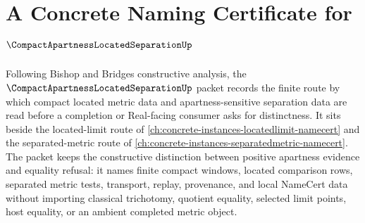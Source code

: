 \chapter{A Concrete Naming Certificate for $\CompactApartnessLocatedSeparationUp$}
\label{ch:concrete-instances-compact-apartness-located-separation-namecert}

Following Bishop and Bridges constructive analysis, the $\CompactApartnessLocatedSeparationUp$ packet records the finite route by which compact located metric data and apartness-sensitive separation data are read before a completion or Real-facing consumer asks for distinctness. It sits beside the located-limit route of \autoref{ch:concrete-instances-locatedlimit-namecert} and the separated-metric route of \autoref{ch:concrete-instances-separatedmetric-namecert}. The packet keeps the constructive distinction between positive apartness evidence and equality refusal: it names finite compact windows, located comparison rows, separated metric tests, transport, replay, provenance, and local NameCert data without importing classical trichotomy, quotient equality, selected limit points, host equality, or an ambient completed metric object.

